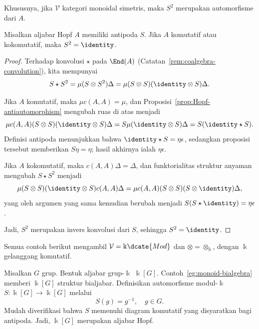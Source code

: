 Khususnya, jika $\mathcal{V}$ kategori monoidal simetris, maka $S^2$ merupakan
automorfisme dari $A$.

\begin{corollary}\label{prop:Hopf-involution}
	Misalkan aljabar Hopf $A$ memiliki antipoda $S$. Jika $A$ komutatif atau
	kokomutatif, maka $S^2=\identity$.
\end{corollary}

\begin{proof}
	Terhadap konvolusi $\star$ pada $\End(A)$
	(Catatan~\ref{rem:coalgebra-convolution}), kita mempunyai
	\[ S \star S^2 = \mu (S \otimes S^2) \Delta = \mu (S \otimes S)(\identity \otimes S) \Delta. \]

	Jika $A$ komutatif, maka $\mu c(A,A)=\mu$, dan
	Proposisi~\ref{prop:Hopf-antiautomorphism} mengubah ruas di atas menjadi
	\[ \mu c(A, A) (S \otimes S) (\identity \otimes S)\Delta = S\mu (\identity \otimes S)\Delta = S(\identity \star S). \]
	Definisi antipoda menunjukkan bahwa
	$\identity\star S=\eta\epsilon$, sedangkan proposisi tersebut memberikan
	$S\eta=\eta$; hasil akhirnya ialah $\eta\epsilon$.

	Jika $A$ kokomutatif, maka $c(A,A)\Delta=\Delta$, dan funktorialitas struktur
	anyaman mengubah $S\star S^2$ menjadi
	\[ \mu (S \otimes S)(\identity \otimes S) c(A, A) \Delta = \mu c(A, A) (S \otimes S)(S \otimes \identity)\Delta, \]
	yang oleh argumen yang sama kemudian berubah menjadi
	$S(S\star\identity)=\eta\epsilon$.

	Jadi, $S^2$ merupakan invers konvolusi dari $S$, sehingga
	$S^2=\identity$.
\end{proof}

Semua contoh berikut mengambil $\mathcal{V}=\Bbbk\dcate{Mod}$ dan
$\otimes=\otimes_{\Bbbk}$, dengan $\Bbbk$ gelanggang komutatif.

\begin{example}\label{eg:group-Hopf-algebra}
	Misalkan $G$ grup. Bentuk aljabar grup-$\Bbbk$ $\Bbbk[G]$.
	Contoh~\ref{eg:monoid-bialgebra} memberi $\Bbbk[G]$ struktur bialjabar.
	Definisikan automorfisme modul-$\Bbbk$
	$S:\Bbbk[G]\to\Bbbk[G]$ melalui
	\[ S(g) = g^{-1}, \quad g \in G. \]
	Mudah diverifikasi bahwa $S$ memenuhi diagram komutatif yang disyaratkan
	bagi antipoda. Jadi, $\Bbbk[G]$ merupakan aljabar Hopf.
\end{example}

